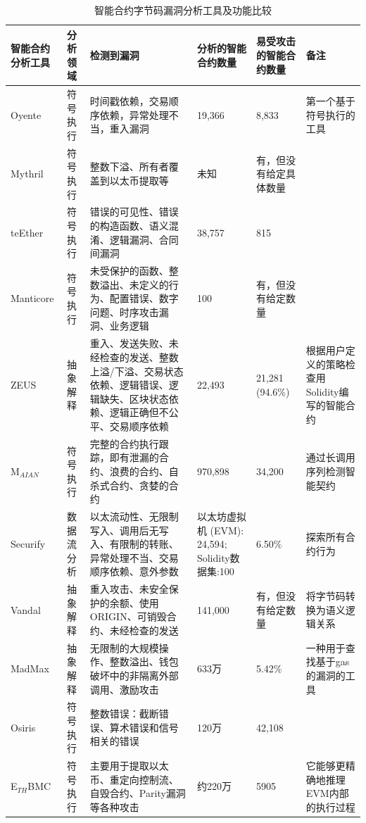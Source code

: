 \begin{translation}
\begin{longtable}[htbp] {|p{1.9cm}|p{1.6cm}|p{4cm}|p{2cm}|p{1.2cm}|p{2cm}|} 
    \caption{智能合约字节码漏洞分析工具及功能比较} 
    \label{tab:智能合约字节码漏洞分析工具及功能比较} \\
    \hline 智能合约分析工具 & 分析领域 & 检测到漏洞 & 分析的智能合约数量 & 易受攻击的智能合约数量 & 备注 \\
    \hline Oyente\cite{art92} & 符号执行 & 时间戳依赖，交易顺序依赖，异常处理不当，重入漏洞 & 19,366 & 8,833 & 第一个基于符号执行的工具 \\
    \hline Mythril\cite{art93} & 符号执行 & 整数下溢、所有者覆盖到以太币提取等 & 未知 & 有，但没有给定具体数量 & \\
    \hline teEther\cite{art94} & 符号执行 & 错误的可见性、错误的构造函数、语义混淆、逻辑漏洞、合同间漏洞 & 38,757 & 815 & \\
    \hline Manticore\cite{art95} & 符号执行 & 未受保护的函数、整数溢出、未定义的行为、配置错误、数字问题、时序攻击漏洞、业务逻辑 & 100 & 有，但没有给定数量 & \\
    \hline ZEUS\cite{art91} & 抽象解释 & 重入、发送失败、未经检查的发送、整数上溢/下溢、交易状态依赖、逻辑错误、逻辑缺失、区块状态依赖、逻辑正确但不公平、交易顺序依赖 & 22,493 & 21,281 (94.6\%) & 根据用户定义的策略检查用Solidity编写的智能合约 \\
    \hline M$_{AIAN}$\cite{art96} & 符号执行 & 完整的合约执行跟踪，即有泄漏的合约、浪费的合约、自杀式合约、贪婪的合约 & 970,898 & 34,200 & 通过长调用序列检测智能契约 \\
    \hline Securify\cite{art90} & 数据流分析 & 以太流动性、无限制写入、调用后无写入、有限制的转账、异常处理不当、交易顺序依赖、意外参数 & 以太坊虚拟机 (EVM): 24,594; Solidity数据集:100 & 6.50\% & 探索所有合约行为 \\
    \hline Vandal\cite{art71} & 抽象解释 & 重入攻击、未安全保护的余额、使用ORIGIN、可销毁合约、未经检查的发送 & 141,000 & 有，但没有给定数量 & 将字节码转换为语义逻辑关系 \\
    \hline MadMax\cite{art97} & 抽象解释 & 无限制的大规模操作、整数溢出、钱包破坏中的非隔离外部调用、激励攻击 & 633万 & 5.42\% & 一种用于查找基于gas的漏洞的工具 \\
    \hline Osiris\cite{art98} & 符号执行 & 整数错误：截断错误、算术错误和信号相关的错误 & 120万 & 42,108 & \\
    \hline E$_{TH}$BMC\cite{art94} & 符号执行 & 主要用于提取以太币、重定向控制流、自毁合约、Parity漏洞等各种攻击 & 约220万 & 5905 & 它能够更精确地推理EVM内部的执行过程 \\
    \hline
\end{longtable}


\end{translation}
